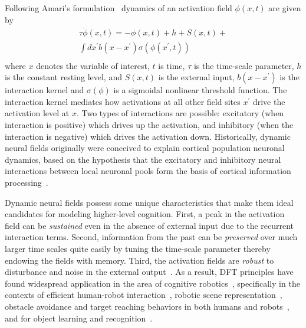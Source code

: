 Following Amari's formulation~\cite{amari1977dynamics} dynamics of an activation field $\phi(x, t)$ are given by 
\begin{multline}
\tau\dot{\phi}(x,t) = -\phi(x,t) + h + S(x,t) + \\ \int\limits_{}^{}dx^{\prime}b(x-x^{\prime})\sigma(\phi(x^{\prime}, t)) 
\end{multline} 
where $x$ denotes the variable of interest, $t$ is time, $\tau$ is the time-scale parameter, $h$ is the constant resting level, and $S(x,t)$ is the external input, $b(x-x^\prime)$ is the interaction kernel and $\sigma(\phi)$ is a sigmoidal nonlinear threshold function. The interaction kernel mediates how activations at all other field sites $x^\prime$ drive the activation level at $x$. Two types of interactions are possible: excitatory (when interaction is positive) which drives up the activation, and inhibitory (when the interaction is negative) which drives the activation down. 
Historically, dynamic neural fields originally were conceived to explain cortical population neuronal dynamics, based on the hypothesis that the excitatory and inhibitory neural interactions between local neuronal pools form the basis of cortical information processing~\cite{wilson1973mathematical}. 

Dynamic neural fields possess some unique characteristics that make them ideal candidates for modeling higher-level cognition. First, a peak in the activation field can be \textit{sustained} even in the absence of external input due to the recurrent interaction terms. Second, information from the past can be \textit{preserved} over much larger time scales quite easily by tuning the time-scale parameter thereby endowing the fields with memory. Third, the activation fields are \textit{robust} to disturbance and noise in the external output~\cite{schoner2008dynamical}. 
As a result, DFT principles have found widespread application in the area of cognitive robotics~\cite{erlhagen2006dynamic}, specifically in the contexts of efficient human-robot interaction~\cite{erlhagen2014dynamic}, robotic scene representation~\cite{zibner2011dynamic}, obstacle avoidance and target reaching behaviors in both humans and robots~\cite{schoner1995dynamics}, and for object learning and recognition~\cite{faubel2008learning}. 



